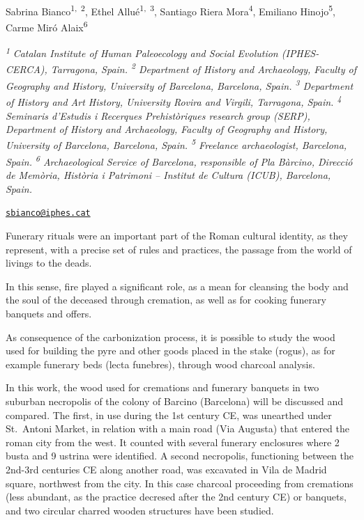 \documentclass[
]{book}
\begin{document}
Sabrina Bianco\textsuperscript{1,~2}, Ethel Allué\textsuperscript{1,~3}, Santiago Riera Mora\textsuperscript{4}, Emiliano Hinojo\textsuperscript{5}, Carme Miró Alaix\textsuperscript{6}

\textsuperscript{\emph{1}} \emph{Catalan Institute of Human Paleoecology and Social Evolution (IPHES-CERCA), Tarragona, Spain. \textsuperscript{2} Department of History and Archaeology, Faculty of Geography and History, University of Barcelona, Barcelona, Spain. \textsuperscript{3} Department of History and Art History, University Rovira and Virgili, Tarragona, Spain. \textsuperscript{4} Seminaris d'Estudis i Recerques Prehistòriques research group (SERP), Department of History and Archaeology, Faculty of Geography and History, University of Barcelona, Barcelona, Spain. \textsuperscript{5} Freelance archaeologist, Barcelona, Spain. \textsuperscript{6} Archaeological Service of Barcelona, responsible of Pla Bàrcino, Direcció de Memòria, Història i Patrimoni -- Institut de Cultura (ICUB), Barcelona, Spain.}

\href{mailto:sbianco@iphes.cat}{\nolinkurl{sbianco@iphes.cat}}

Funerary rituals were an important part of the Roman cultural identity, as they represent, with a precise set of rules and practices, the passage from the world of livings to the deads.

In this sense, fire played a significant role, as a mean for cleansing the body and the soul of the deceased through cremation, as well as for cooking funerary banquets and offers.

As consequence of the carbonization process, it is possible to study the wood used for building the pyre and other goods placed in the stake (rogus), as for example funerary beds (lecta funebres), through wood charcoal analysis.

In this work, the wood used for cremations and funerary banquets in two suburban necropolis of the colony of Barcino (Barcelona) will be discussed and compared. The first, in use during the 1st century CE, was unearthed under St.~Antoni Market, in relation with a main road (Via Augusta) that entered the roman city from the west. It counted with several funerary enclosures where 2 busta and 9 ustrina were identified. A second necropolis, functioning between the 2nd-3rd centuries CE along another road, was excavated in Vila de Madrid square, northwest from the city. In this case charcoal proceeding from cremations (less abundant, as the practice decresed after the 2nd century CE) or banquets, and two circular charred wooden structures have been studied.
\end{document}
